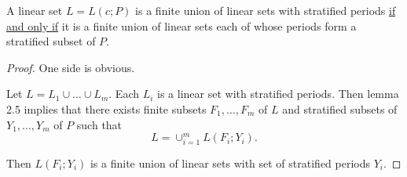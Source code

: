 \documentclass{beamer}
\begin{document}
\begin{frame}

\begin{corollary}[1]\label{corollary 1}
A linear set $L = L(c ; P)$ is a finite union of linear sets with stratified periods \underline{if and only if} it is a finite union
of linear sets each of whose periods form a stratified subset of $P$.
\end{corollary}

\begin{proof}
One side is obvious.\smallskip

Let $L = L_1 \cup \dots \cup L_m$. Each $L_i$ is a linear set with stratified periods. Then lemma 2.5 implies that
there exists finite subsets $F_1,\dots,F_m$ of $L$ and stratified subsets of $Y_1,\dots,Y_m$ of $P$ such that
\[ L = \cup_{i = 1} ^ m L(F_i ; Y_i).\]

Then $L(F_i;Y_i)$ is a finite union of linear sets with set of stratified periods $Y_i$.
\end{proof}
\end{frame}
\end{document}
